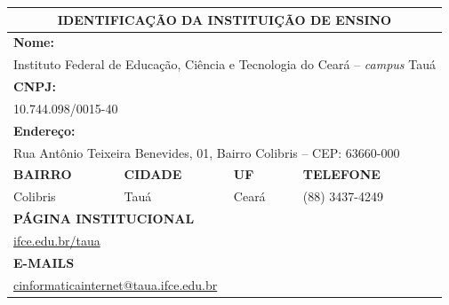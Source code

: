 \documentclass[
	12pt,				%
	openright,			%
	twoside,			%
	a4paper,			%
	chapter=TITLE,		%
	english,			%
	french,				%
	spanish,			%
	brazil,				%
	]{abntex2}
\begin{document}
\small
\noindent
\begin{tabularx}{\linewidth}{X X X X }
    
    \multicolumn{4}{c}{\textbf{IDENTIFICAÇÃO DA INSTITUIÇÃO DE ENSINO}} \\
    \toprule
    \multicolumn{4}{l}{\cellcolor{gray!20}\textbf{Nome:}} \\
    \multicolumn{4}{l}{Instituto Federal de Educação, Ciência e Tecnologia do Ceará -- \textit{campus} Tauá} \\
    
    \multicolumn{4}{l}{\cellcolor{gray!20}\textbf{CNPJ:}} \\
    \multicolumn{4}{l}{10.744.098/0015-40} \\
    
    \multicolumn{4}{l}{\cellcolor{gray!20}\textbf{Endere\c{c}o:}} \\
    \multicolumn{4}{l}{Rua Antônio Teixeira Benevides, 01, Bairro Colibris -- CEP: 63660-000} \\
    
    
     
    \cellcolor{gray!20} \textbf{BAIRRO} & \cellcolor{gray!20} \textbf{CIDADE} & \cellcolor{gray!20} \textbf{UF} & \cellcolor{gray!20} \textbf{TELEFONE} \\
     
     Colibris & Tauá & Ceará & (88) 3437-4249\\

     \multicolumn{4}{l}{\cellcolor{gray!20}\textbf{PÁGINA INSTITUCIONAL}} \\
     \multicolumn{4}{l}{\href{http://ifce.edu.br/taua}{ifce.edu.br/taua}} \\
     
     
     \multicolumn{4}{l}{\cellcolor{gray!20}\textbf{E-MAILS}} \\
     \multicolumn{4}{l}{\href{mailto:cinformaticainternet@taua.ifce.edu.br}{cinformaticainternet@taua.ifce.edu.br}} \\
     
     \bottomrule
     
\end{tabularx}
\vspace{2em}
\noindent
\end{document}
